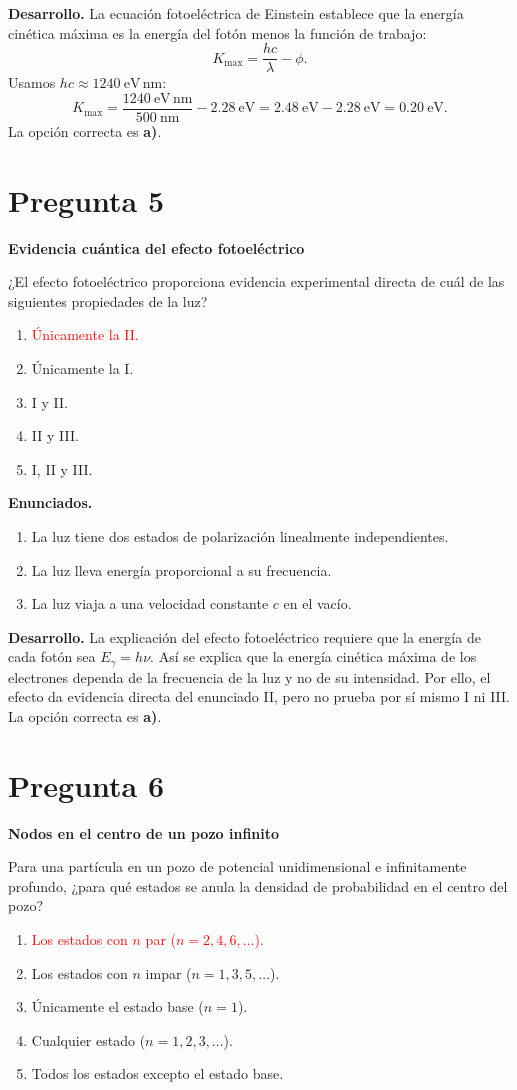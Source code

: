 \documentclass[a4paper,11pt]{article}
\newcommand{\pregunta}[2]{\section*{Pregunta #1}\textbf{#2}\par}
\begin{document}
\textbf{Desarrollo.} La ecuación fotoeléctrica de Einstein establece que la energía cinética máxima es la energía del fotón menos la función de trabajo:
\[
K_{\max}=\frac{hc}{\lambda}-\phi.
\]
Usamos $hc\approx1240\ \mathrm{eV\,nm}$:
\[
K_{\max}=\frac{1240\ \mathrm{eV\,nm}}{500\ \mathrm{nm}}-2.28\ \mathrm{eV}
=2.48\ \mathrm{eV}-2.28\ \mathrm{eV}
=0.20\ \mathrm{eV}.
\]
La opción correcta es \textbf{a)}. \parencite[Sec. 16.1, pp. 521--523]{chaparro2026}

\pregunta{5}{Evidencia cuántica del efecto fotoeléctrico}

¿El efecto fotoeléctrico proporciona evidencia experimental directa de cuál de las siguientes propiedades de la luz?

\begin{enumerate}
    \item \textcolor{red}{Únicamente la II.}
    \item Únicamente la I.
    \item I y II.
    \item II y III.
    \item I, II y III.
\end{enumerate}

\textbf{Enunciados.}
\begin{enumerate}[label=\Roman*.,leftmargin=*]
    \item La luz tiene dos estados de polarización linealmente independientes.
    \item La luz lleva energía proporcional a su frecuencia.
    \item La luz viaja a una velocidad constante $c$ en el vacío.
\end{enumerate}

\textbf{Desarrollo.} La explicación del efecto fotoeléctrico requiere que la energía de cada fotón sea $E_\gamma=h\nu$. Así se explica que la energía cinética máxima de los electrones dependa de la frecuencia de la luz y no de su intensidad. Por ello, el efecto da evidencia directa del enunciado II, pero no prueba por sí mismo I ni III. La opción correcta es \textbf{a)}. \parencite[Sec. 16.1, pp. 521--523; Sec. 16.3.1, pp. 540--541]{chaparro2026}

\pregunta{6}{Nodos en el centro de un pozo infinito}

Para una partícula en un pozo de potencial unidimensional e infinitamente profundo, ¿para qué estados se anula la densidad de probabilidad en el centro del pozo?

\begin{enumerate}
    \item \textcolor{red}{Los estados con $n$ par ($n=2,4,6,\ldots$).}
    \item Los estados con $n$ impar ($n=1,3,5,\ldots$).
    \item Únicamente el estado base ($n=1$).
    \item Cualquier estado ($n=1,2,3,\ldots$).
    \item Todos los estados excepto el estado base.
\end{enumerate}
\end{document}
